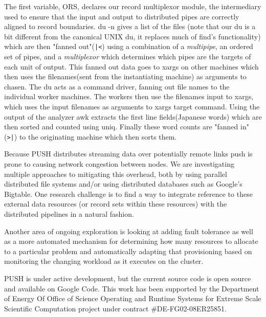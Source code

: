 \documentclass{sig-alt-release2}
\begin{document}
The first variable, ORS, declares our record multiplexor module, the intermediary 
used to ensure that the input and output to distributed pipes are correctly 
aligned to record boundaries. du -n gives a list of the files (note that our 
du is a bit different from the canonical UNIX du, it replaces much of find's 
functionality) which are then "fanned out"(\verb!|<!) using a combination 
of a \emph{multipipe}, an ordered set of pipes, and a \emph{multiplexor} 
which determines which pipes are the targets of each unit of output.  
This fanned out data goes to xargs on other machines which 
then uses the filenames(sent from the instantiating machine) as arguments to 
chasen. The du acts as a command driver, fanning out file names to the 
individual worker machines. The workers then use the filenames input to 
xargs, which uses the input filenames as arguments to xargs target command. 
Using the output of the analyzer awk extracts the first line fields(Japanese 
words) which are then sorted and counted using uniq.  Finally these word 
counts are "fanned in"(\verb!>|!) to the originating machine which then 
sorts them. 



Because PUSH distributes streaming data over potentially remote links push 
is prone to causing network congestion between nodes. 
We are investigating multiple approaches to mitigating this overhead, both
by using parallel distributed file systems and/or using distributed
databases such as Google's Bigtable.
One research challenge is to find a way to integrate reference to these
external data resources (or record sets within these resources) with the
distributed pipelines in a natural fashion.

Another area of ongoing exploration is looking at adding fault tolerance as 
well as a more automated mechanism for determining how many resources to 
allocate to a particular problem and automatically adapting that provisioning 
based on monitoring the changing workload as it executes on the 
cluster.

PUSH is under active development, but the current source code is open source 
and available on Google Code.
This work has been supported by the Department of Energy Of Office of Science Operating and Runtime Systems for Extreme Scale Scientific Computation project under contract \#DE-FG02-08ER25851. 



\end{document}
